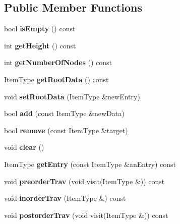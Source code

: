 \subsection*{Public Member Functions}
\begin{DoxyCompactItemize}
\item 
\hypertarget{class_red_black_tree_af3713cafd8989d89f3685f56c7f36702}{}\label{class_red_black_tree_af3713cafd8989d89f3685f56c7f36702} 
bool {\bfseries is\+Empty} () const
\item 
\hypertarget{class_red_black_tree_ac8c0d6f98d9c7cc53b15d9364014fbcc}{}\label{class_red_black_tree_ac8c0d6f98d9c7cc53b15d9364014fbcc} 
int {\bfseries get\+Height} () const
\item 
\hypertarget{class_red_black_tree_ac08bdca9a79721e58b7a57a7a3921ba6}{}\label{class_red_black_tree_ac08bdca9a79721e58b7a57a7a3921ba6} 
int {\bfseries get\+Number\+Of\+Nodes} () const
\item 
\hypertarget{class_red_black_tree_a6b7d3b3463133035a5864bc8c25bf0fc}{}\label{class_red_black_tree_a6b7d3b3463133035a5864bc8c25bf0fc} 
Item\+Type {\bfseries get\+Root\+Data} () const
\item 
\hypertarget{class_red_black_tree_ace37f9b72094ce968461f54f4374b9ce}{}\label{class_red_black_tree_ace37f9b72094ce968461f54f4374b9ce} 
void {\bfseries set\+Root\+Data} (Item\+Type \&new\+Entry)
\item 
\hypertarget{class_red_black_tree_aa2b3d785de13923e62f42a5f99d913d7}{}\label{class_red_black_tree_aa2b3d785de13923e62f42a5f99d913d7} 
bool {\bfseries add} (const Item\+Type \&new\+Data)
\item 
\hypertarget{class_red_black_tree_a9c196b5513df89b2daabad5c59917268}{}\label{class_red_black_tree_a9c196b5513df89b2daabad5c59917268} 
bool {\bfseries remove} (const Item\+Type \&target)
\item 
\hypertarget{class_red_black_tree_a3c359138ca12b255645857a7eeb68ff4}{}\label{class_red_black_tree_a3c359138ca12b255645857a7eeb68ff4} 
void {\bfseries clear} ()
\item 
\hypertarget{class_red_black_tree_aa966683700681d154286668bb38871c4}{}\label{class_red_black_tree_aa966683700681d154286668bb38871c4} 
Item\+Type {\bfseries get\+Entry} (const Item\+Type \&an\+Entry) const
\item 
\hypertarget{class_red_black_tree_a3eb7fc10aade40772a734f9fd3168a71}{}\label{class_red_black_tree_a3eb7fc10aade40772a734f9fd3168a71} 
void {\bfseries preorder\+Trav} (void visit(Item\+Type \&)) const
\item 
\hypertarget{class_red_black_tree_a0675414d0278dcb0a4f4e27fd5e8dcd4}{}\label{class_red_black_tree_a0675414d0278dcb0a4f4e27fd5e8dcd4} 
void {\bfseries inorder\+Trav} (Item\+Type \&) const
\item 
\hypertarget{class_red_black_tree_a420f5aee2e3f306985ce6bd80b7f8d70}{}\label{class_red_black_tree_a420f5aee2e3f306985ce6bd80b7f8d70} 
void {\bfseries postorder\+Trav} (void visit(Item\+Type \&)) const
\end{DoxyCompactItemize}
